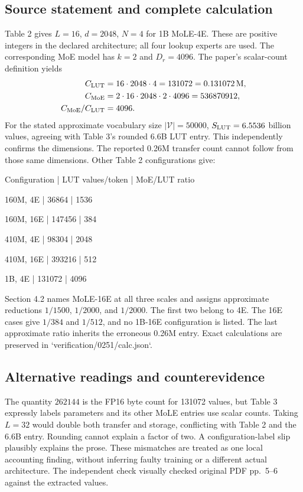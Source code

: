 \documentclass[10pt]{article}
\begin{document}
\subsection*{Source statement and complete calculation}
Table 2 gives \(L=16\), \(d=2048\), \(N=4\) for 1B MoLE-4E. These are positive integers in the declared architecture; all four lookup experts are used. The corresponding MoE model has \(k=2\) and \(D_r=4096\). The paper’s scalar-count definition yields \[\begin{aligned}
 C_{\rm LUT}&=16\cdot2048\cdot4=131072=0.131072\,{\rm M},\\
 C_{\rm MoE}&=2\cdot16\cdot2048\cdot2\cdot4096=536870912,\\
 C_{\rm MoE}/C_{\rm LUT}&=4096.\end{aligned}\] For the stated approximate vocabulary size \(|\mathcal V|=50000\), \(S_{\rm LUT}=6.5536\) billion values, agreeing with Table 3’s rounded 6.6B LUT entry. This independently confirms the dimensions. The reported 0.26M transfer count cannot follow from those same dimensions. Other Table 2 configurations give:\par
Configuration | LUT values/token | MoE/LUT ratio\par
160M, 4E | 36864 | 1536\par
160M, 16E | 147456 | 384\par
410M, 4E | 98304 | 2048\par
410M, 16E | 393216 | 512\par
1B, 4E | 131072 | 4096\par
Section 4.2 names MoLE-16E at all three scales and assigns approximate reductions \(1/1500\), \(1/2000\), and \(1/2000\). The first two belong to 4E. The 16E cases give \(1/384\) and \(1/512\), and no 1B-16E configuration is listed. The last approximate ratio inherits the erroneous 0.26M entry. Exact calculations are preserved in `verification/0251/calc.json`.\par
\subsection*{Alternative readings and counterevidence}
The quantity \(262144\) is the FP16 byte count for 131072 values, but Table 3 expressly labels parameters and its other MoLE entries use scalar counts. Taking \(L=32\) would double both transfer and storage, conflicting with Table 2 and the 6.6B entry. Rounding cannot explain a factor of two. A configuration-label slip plausibly explains the prose. These mismatches are treated as one local accounting finding, without inferring faulty training or a different actual architecture. The independent check visually checked original PDF pp. 5–6 against the extracted values.\par
\end{document}
